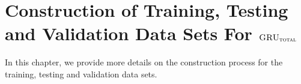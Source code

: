 \documentclass[letterpaper,12pt,titlepage,oneside,final]{book}
\numberwithin{equation}{section}
\theoremstyle{definition}
\newcommand{\modelT}{\textsc{GRU}_{\textsc{total}}}
\begin{document}
%	

\chapter{Construction of Training, Testing and Validation Data Sets For $\modelT$}
\label{app:ScenarioConstruction}
In this chapter, we provide more details on the construction  process for the training, testing and validation data sets.
\end{document}
